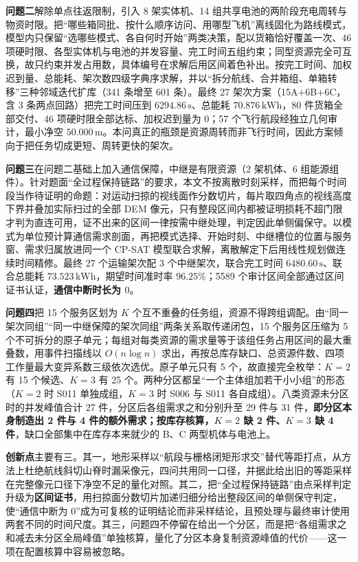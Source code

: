 \documentclass[withoutpreface,bwprint]{format}
\begin{document}
\textbf{问题二}解除单点往返限制，引入 8 架实体机、14 组共享电池的两阶段充电周转与物资时限。把“哪些箱同批、按什么顺序访问、用哪型飞机”离线固化为路线模式，模型内只保留“选哪些模式、各自何时开始”两类决策，配以货箱恰好覆盖一次、46 项硬时限、各型实体机与电池的并发容量、完工时间五组约束；同型资源完全可互换，故只约束并发占用数，具体编号在求解后用区间着色补出。按完工时间、加权迟到量、总能耗、架次数四级字典序求解，并以“拆分航线、合并箱组、单箱转移”三种邻域迭代扩库（341 条增至 601 条）。最终 27 架次方案（15A$+$6B$+$6C，含 3 条两点回路）把完工时间压到 $6294.86\,\text{s}$、总能耗 $70.876\,\text{kWh}$，80 件货箱全部交付、46 项硬时限全部达标、加权迟到量为 $0$；57 个飞行航段经独立几何审计，最小净空 $50.000\,\text{m}$。本问真正的瓶颈是资源周转而非飞行时间，因此方案倾向于把任务切成更短、周转更快的架次。

\textbf{问题三}在问题二基础上加入通信保障，中继是有限资源（2 架机体、6 组能源组件）。针对题面“全过程保持链路”的要求，本文不按离散时刻采样，而把每个时间段当作待证明的命题：对运动扫掠的视线面作分数切片，每片取四角点的视线高度下界并叠加实际扫过的全部 DEM 像元，只有整段区间内都被证明损耗不超门限才判为直连可用，证不出来的区间一律按需中继处理，判定因此单侧偏保守。以模式为单位预计算通信需求剖面，再把模式选择、开始时刻、中继槽位的位置与服务窗、需求归属放进同一个 CP-SAT 模型联合求解，离散解定下后用线性规划做连续时间精修。最终 27 个运输架次配 3 个中继架次，联合完工时间 $6480.60\,\text{s}$、联合总能耗 $73.523\,\text{kWh}$，期望时间准时率 $96.25\%$；5589 个审计区间全部通过区间证书认证，\textbf{通信中断时长为 $0$}。

\textbf{问题四}把 15 个服务区划为 $K$ 个互不重叠的任务组，资源不得跨组调配。由“同一架次同组”“同一中继保障的架次同组”两条关系取传递闭包，15 个服务区压缩为 5 个不可拆分的原子单元；每组对每类资源的需求量等于该组任务占用区间的最大重叠数，用事件扫描线以 $O(n\log n)$ 求出，再按总库存缺口、总资源件数、四项工作量最大变异系数三级依次选优。原子单元只有 5 个，故直接完全枚举：$K=2$ 有 15 个候选、$K=3$ 有 25 个。两种分区都呈“一个主体组加若干小小组”的形态（$K=2$ 时 S011 单独成组，$K=3$ 时 S006 与 S011 各自成组）。八类资源未分区时的并发峰值合计 27 件，分区后各组需求之和分别升至 29 件与 31 件，\textbf{即分区本身制造出 2 件与 4 件的额外需求；按库存核算，$K=2$ 缺 2 件、$K=3$ 缺 4 件}，缺口全部集中在库存本来就少的 B、C 两型机体与电池上。

\textbf{创新点}主要有三。其一，地形采样以“航段与栅格闭矩形求交”替代等距打点，从方法上杜绝航线斜切山脊时漏采像元，四问共用同一口径，并据此给出旧的等距采样在完整像元口径下净空不足的量化对照。其二，把“全过程保持链路”由点采样判定升级为\textbf{区间证书}，用扫掠面分数切片加递归细分给出整段区间的单侧保守判定，使“通信中断为 0”成为可复核的证明结论而非采样结论，且预处理与最终审计使用两套不同的时间尺度。其三，问题四不停留在给出一个分区，而是把“各组需求之和减去未分区全局峰值”单独核算，量化了分区本身复制资源峰值的代价——这一项在配置核算中容易被忽略。
\end{document}
